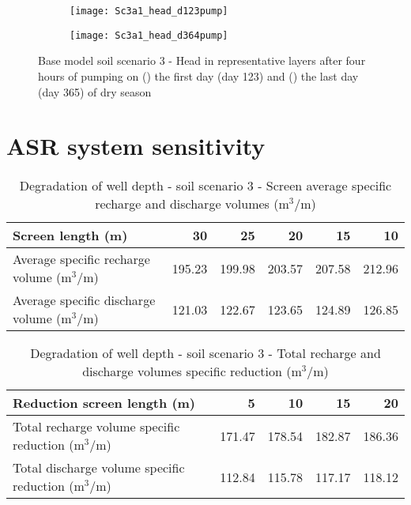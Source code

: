 \begin{figure}[h!]
	\centering
	\begin{subfigure}[b]{0.5\linewidth}
		\centering\texttt{[image: Sc3a1\_head\_d123pump]}
		\captionsetup{justification=centering}		
		\caption{\label{fig:Sc3a1_head_d123pump}}
		\end{subfigure}\hfill
	\begin{subfigure}[b]{0.5\linewidth}
        \centering\texttt{[image: Sc3a1\_head\_d364pump]}
		\captionsetup{justification=centering}		
		\caption{\label{fig:Sc3a1_head_d364pump}}
		\end{subfigure}
		\captionsetup{justification=centering}	
	\caption{Base model soil scenario 3 - Head in representative layers after four hours of pumping on () the first day (day 123) and () the last day (day 365) of dry season} 
	\label{fig:Example_Sc3_base_head_dry}
\end{figure} 

\newpage

\section{ASR system sensitivity}
\label{section:addition_sens}

\begin{table}[h!]
\small
\centering
\caption{Degradation of well depth - soil scenario 3 - Screen average specific recharge and discharge volumes (m$^3$/m)}
\label{tab:sc3_up_clean_rev_specific_volume}
\begin{tabular}{l|r|r|r|r|r}
\hline 
\textbf{Screen length (m)}                   & \textbf{30}      & \textbf{25}      & \textbf{20}      & \textbf{15}      & \textbf{10}       \\ \hline \hline
Average specific recharge volume (m$^3$/m)   & 195.23  & 199.98  & 203.57  & 207.58  & 212.96   \\ \hline 
Average specific discharge volume (m$^3$/m)  & 121.03  & 122.67  & 123.65  & 124.89  & 126.85   \\ \hline     
\end{tabular}
\end{table}

\begin{table}[h!]
\small
\centering
\caption{Degradation of well depth - soil scenario 3 - Total recharge and discharge volumes specific reduction (m$^3$/m)}
\label{tab:sc3_up_clean_rev_specific_volume_reduction}
\begin{tabular}{l|r|r|r|r}
\hline 
\textbf{Reduction screen length (m)}                 & \textbf{5}      & \textbf{10}      & \textbf{15}      & \textbf{20}       \\ \hline \hline
Total recharge volume specific reduction (m$^3$/m)   & 171.47  & 178.54  & 182.87  & 186.36    \\ \hline 
Total discharge volume specific reduction (m$^3$/m)  & 112.84  & 115.78  & 117.17  & 118.12    \\ \hline     
\end{tabular}
\end{table}


